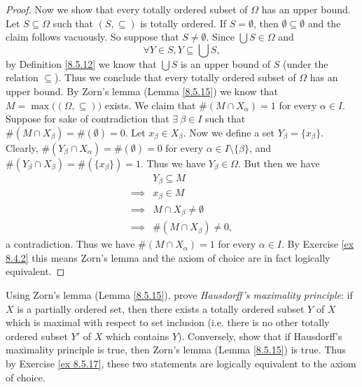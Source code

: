 \begin{proof}
    Now we show that every totally ordered subset of \(\Omega\) has an upper bound.
    Let \(S \subseteq \Omega\) such that \((S, \subseteq)\) is totally ordered.
    If \(S = \emptyset\), then \(\emptyset \subseteq \emptyset\) and the claim follows vacuously.
    So suppose that \(S \neq \emptyset\).
    Since \(\bigcup S \in \Omega\) and
    \[
        \forall Y \in S, Y \subseteq \bigcup S,
    \]
    by Definition \ref{8.5.12} we know that \(\bigcup S\) is an upper bound of \(S\) (under the relation \(\subseteq\)).
    Thus we conclude that every totally ordered subset of \(\Omega\) has an upper bound.
    By Zorn's lemma (Lemma \ref{8.5.15}) we know that \(M = \max\big((\Omega, \subseteq)\big)\) exists.
    We claim that \(\#(M \cap X_{\alpha}) = 1\) for every \(\alpha \in I\).
    Suppose for sake of contradiction that \(\exists\ \beta \in I\) such that \(\#(M \cap X_{\beta}) = \#(\emptyset) = 0\).
    Let \(x_{\beta} \in X_{\beta}\).
    Now we define a set \(Y_{\beta} = \{x_{\beta}\}\).
    Clearly, \(\#(Y_{\beta} \cap X_{\alpha}) = \#(\emptyset) = 0\) for every \(\alpha \in I \setminus \{\beta\}\), and \(\#(Y_{\beta} \cap X_{\beta}) = \#(\{x_{\beta}\}) = 1\).
    Thus we have \(Y_{\beta} \in \Omega\).
    But then we have
    \begin{align*}
                 & Y_{\beta} \subseteq M           \\
        \implies & x_{\beta} \in M                 \\
        \implies & M \cap X_{\beta} \neq \emptyset \\
        \implies & \#(M \cap X_{\beta}) \neq 0,
    \end{align*}
    a contradiction.
    Thus we have \(\#(M \cap X_{\alpha}) = 1\) for every \(\alpha \in I\).
    By Exercise \ref{ex 8.4.2} this means Zorn's lemma and the axiom of choice are in fact logically equivalent.
\end{proof}

\begin{exercise}\label{ex 8.5.18}
    Using Zorn's lemma (Lemma \ref{8.5.15}), prove \emph{Hausdorff's maximality principle}:
    if \(X\) is a partially ordered set, then there exists a totally ordered subset \(Y\) of \(X\) which is maximal with respect to set inclusion
    (i.e. there is no other totally ordered subset \(Y'\) of \(X\) which contains \(Y\)).
    Conversely, show that if Hausdorff's maximality principle is true, then Zorn's lemma (Lemma \ref{8.5.15}) is true.
    Thus by Exercise \ref{ex 8.5.17}, these two statements are logically equivalent to the axiom of choice.
\end{exercise}

